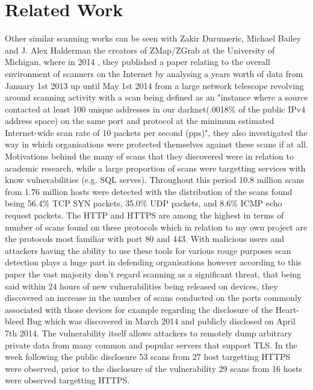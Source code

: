 \documentclass[a4wide,leqno,12pt]{report}
\begin{document}
\chapter{Related Work}
Other similar scanning works can be seen with Zakir Durumeric, Michael Bailey and J. Alex Halderman the creators of ZMap/ZGrab at the University of Michigan,  where in 2014 \cite{durumeric2014internet}, they published a paper relating to the overall environment of scanners on the Internet by analysing a years worth of data from January 1st 2013 up until May 1st 2014 from a large network telescope revolving around scanning activity with a scan being defined as an "instance where a source contacted at least 100 unique addresses in our darknet(.0018\% of the public IPv4 address space) on the same port and protocol at the minimum estimated Internet-wide scan rate of 10 packets per second (pps)", they also investigated the way in which organisations were protected themselves against these scans if at all. Motivations behind the many of scans that they discovered were in relation to academic research, while a large proportion of scans were targetting services with know vulnerabilities (e.g. SQL serves). Throughout this period 10.8 million scans from 1.76 million hosts were detected with the distribution of the scans found being 56.4\% TCP SYN packets, 35.0\% UDP packets, and 8.6\% ICMP echo request packets. The HTTP and HTTPS are among the highest in terms of number of scans found on these protocols which in relation to my own project are the protocols most familiar with port 80 and 443. With malicious users and attackers having the ability to use these tools for various rouge purposes scan detection plays a huge part in defending organisations however according to this paper the vast majority don't regard scanning as a significant threat, that being said within 24 hours of new vulnerabilities being released on devices, they discovered an increase in the number of scans conducted on the ports commonly associated with those devices for example regarding the disclosure of the Heart-bleed Bug which was discovered in March 2014 and publicly disclosed on April 7th 2014. The vulnerability itself allows attackers to remotely dump arbitrary private data from many common and popular servers that support TLS. In the week following the public disclosure 53 scans from 27 host targetting HTTPS were observed, prior to the disclosure of the vulnerability 29 scans from 16 hosts were observed targetting HTTPS.\\
\end{document}
